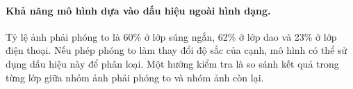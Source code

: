 \paragraph{Khả năng mô hình dựa vào dấu hiệu ngoài hình dạng.} Tỷ lệ ảnh phải phóng to là 60\% ở lớp súng ngắn, 62\% ở lớp dao và 23\% ở lớp điện thoại. Nếu phép phóng to làm thay đổi độ sắc của cạnh, mô hình có thể sử dụng dấu hiệu này để phân loại. Một hướng kiểm tra là so sánh kết quả trong từng lớp giữa nhóm ảnh phải phóng to và nhóm ảnh còn lại.
